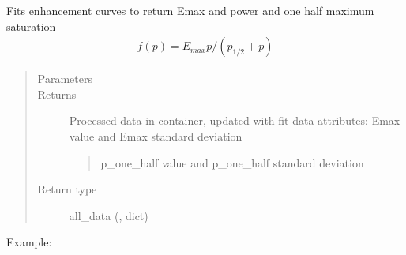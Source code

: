 \documentclass[letterpaper,10pt,english]{sphinxmanual}
\begin{document}

\begin{fulllineitems}
\label{\detokenize{dnpFit:dnpLab.dnpFit.enhancementFit}}
Fits enhancement curves to return Emax and power and one half maximum saturation
\begin{equation*}
\begin{split}f(p) = E_{max} p / (p_{1/2} + p)\end{split}
\end{equation*}\begin{quote}\begin{description}
\item[{Parameters}] \leavevmode
{} \sphinxhyphen{}\sphinxhyphen{} 

\item[{Returns}] \leavevmode

Processed data in container, updated with fit data
attributes: Emax value and Emax standard deviation
\begin{quote}

p\_one\_half value and p\_one\_half standard deviation
\end{quote}


\item[{Return type}] \leavevmode
all\_data ({\hyperref[\detokenize{dnpData:dnpLab.dnpdata}]{}}, dict)

\end{description}\end{quote}

Example:

\begin{sphinxVerbatim}[commandchars=\\\{\}]
 

 



\end{sphinxVerbatim}
\end{fulllineitems}
\end{document}
